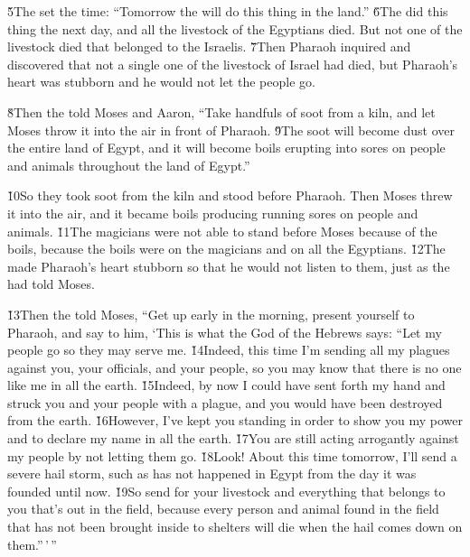 \v{5}The  set the time: ``Tomorrow the  will do this thing in the land.'' \v{6}The  did this thing the next day, and all the livestock of the Egyptians died. But not one of the livestock died that belonged to the Israelis. \v{7}Then Pharaoh inquired and discovered that not a single one of the livestock of Israel had died, but Pharaoh's heart was stubborn and he would not let the people go.

\v{8}Then the  told Moses and Aaron, ``Take handfuls of soot from a kiln, and let Moses throw it into the air in front of Pharaoh. \v{9}The soot will become dust over the entire land of Egypt, and it will become boils erupting into sores on people and animals throughout the land of Egypt.''

\v{10}So they took soot from the kiln and stood before Pharaoh. Then Moses threw it into the air, and it became boils producing running sores on people and animals. \v{11}The magicians were not able to stand before Moses because of the boils, because the boils were on the magicians and on all the Egyptians. \v{12}The  made Pharaoh's heart stubborn so that he would not listen to them, just as the  had told Moses.

\v{13}Then the  told Moses, ``Get up early in the morning, present yourself to Pharaoh, and say to him, `This is what the  God of the Hebrews says: ``Let my people go so they may serve me. \v{14}Indeed, this time I'm sending all my plagues against you, your officials, and your people, so you may know that there is no one like me in all the earth. \v{15}Indeed, by now I could have sent forth my hand and struck you and your people with a plague, and you would have been destroyed from the earth. \v{16}However, I've kept you standing in order to show you my power and to declare my name in all the earth. \v{17}You are still acting arrogantly against my people by not letting them go. \v{18}Look! About this time tomorrow, I'll send a severe hail storm, such as has not happened in Egypt from the day it was founded until now. \v{19}So send for your livestock and everything that belongs to you that's out in the field, because every person and animal found in the field that has not been brought inside to shelters will die when the hail comes down on them.''\,'\,''

